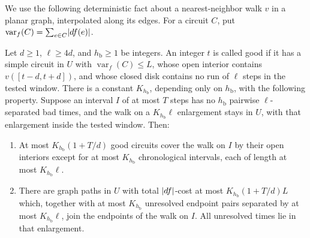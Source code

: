 We use the following deterministic fact about a nearest-neighbor
walk \(v\) in a planar graph, interpolated along its edges.
For a circuit \(C\), put
\(\operatorname{var}_f(C)=\sum_{e\in C}\lvert df(e)\rvert\).

\begin{lemma}
\label{lem:segment-cover}
Let \(d\ge1\), \(\ell\ge4d\), and \(h_{\mathrm b}\ge1\) be
integers.  An integer \(t\) is called good if it has a simple
circuit in \(U\) with \(\operatorname{var}_f(C)\le L\), whose
open interior contains \(v([t-d,t+d])\), and whose closed disk
contains no run of \(\ell\) steps in the tested window.
There is a constant \(K_{h_{\mathrm b}}\), depending only on
\(h_{\mathrm b}\), with the following property.  Suppose an interval
\(I\) of at most \(T\) steps has no
\(h_{\mathrm b}\) pairwise \(\ell\)-separated bad times, and
the walk on a \(K_{h_{\mathrm b}}\ell\) enlargement stays in
\(U\), with that enlargement inside the tested window.  Then:
\begin{enumerate}[label=(\roman*)]
\item At most \(K_{h_{\mathrm b}}(1+T/d)\) good circuits cover
the walk on \(I\) by their open interiors except for at most
\(K_{h_{\mathrm b}}\) chronological intervals, each of length
at most \(K_{h_{\mathrm b}}\ell\).
\item There are graph paths in \(U\) with total \(\lvert df\rvert\)-cost
at most \(K_{h_{\mathrm b}}(1+T/d)L\) which, together with at
most \(K_{h_{\mathrm b}}\) unresolved endpoint pairs separated
by at most \(K_{h_{\mathrm b}}\ell\), join the endpoints of
the walk on \(I\).  All unresolved times lie in that
enlargement.
\end{enumerate}
\end{lemma}

